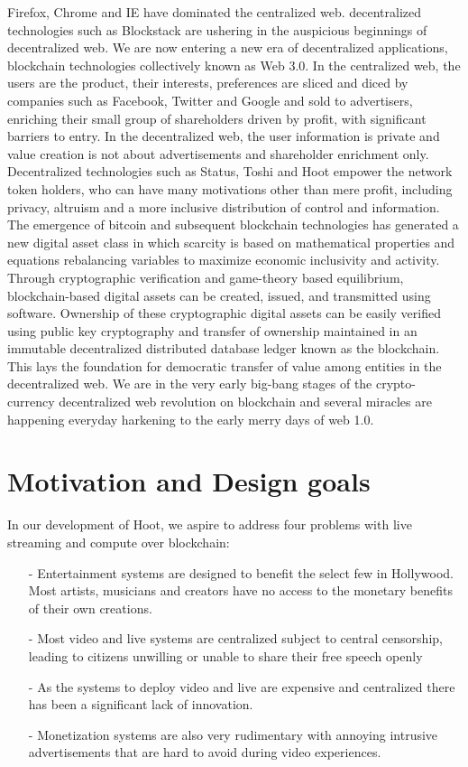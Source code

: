 \documentclass{article}
\begin{document}

 
 Firefox, Chrome and IE have dominated the centralized web. decentralized technologies such as Blockstack are ushering in the auspicious beginnings of decentralized web. 
 We are now entering a new era of decentralized applications, blockchain technologies collectively known as Web 3.0. In the centralized web, the users are the product, their interests, preferences are sliced and diced by companies such as Facebook, Twitter and Google and sold to advertisers, enriching their small group of shareholders driven by profit, with significant barriers to entry. In the
decentralized web, the user information is private and value creation is not about advertisements and shareholder enrichment only. Decentralized technologies such as Status, Toshi and Hoot empower the network token holders, who can have many motivations other than mere profit, including privacy, altruism and a more inclusive distribution of control and information. The emergence of bitcoin and subsequent blockchain technologies has generated a new digital asset class in which scarcity is based on mathematical properties and equations rebalancing variables to maximize economic inclusivity and activity. Through cryptographic verification and game-theory based equilibrium, blockchain-based digital assets can be created, issued, and transmitted using software. Ownership of these cryptographic digital assets can be easily verified using public key cryptography and transfer of ownership maintained in an immutable decentralized distributed database ledger known as the blockchain. This lays the foundation for democratic transfer of value among entities in the decentralized web.
 We are in the very early big-bang stages of the crypto-currency decentralized web revolution on blockchain and several miracles are happening everyday harkening to the early merry days of web 1.0.

\section{Motivation and Design goals}
In our development of Hoot, we aspire to address four problems with live streaming and compute over blockchain:
\begin{itemize}
\item[-]Entertainment systems are designed to benefit the select few in Hollywood. Most artists, musicians and creators have no access to the monetary benefits of their own creations.
\item[-]Most video and live systems are centralized subject to central censorship, leading to citizens unwilling or unable to share their free speech openly
\item[-]As the systems to deploy video and live are expensive and centralized there has been a significant lack of innovation.
\item[-]Monetization systems are also very rudimentary with annoying intrusive advertisements that are hard to avoid during video experiences. 
\end{itemize}
\end{document}
